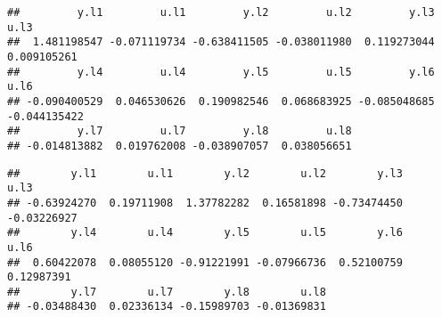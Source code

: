 \documentclass[
]{book}
\newenvironment{Shaded}{\begin{snugshade}}{\end{snugshade}}
\newcommand{\AttributeTok}[1]{\textcolor[rgb]{0.77,0.63,0.00}{#1}}
\newcommand{\DecValTok}[1]{\textcolor[rgb]{0.00,0.00,0.81}{#1}}
\newcommand{\FunctionTok}[1]{\textcolor[rgb]{0.00,0.00,0.00}{#1}}
\newcommand{\NormalTok}[1]{#1}
\newcommand{\OtherTok}[1]{\textcolor[rgb]{0.56,0.35,0.01}{#1}}
\newcommand{\SpecialCharTok}[1]{\textcolor[rgb]{0.00,0.00,0.00}{#1}}
\newcommand{\StringTok}[1]{\textcolor[rgb]{0.31,0.60,0.02}{#1}}
\begin{document}
\begin{Shaded}
\end{Shaded}

\begin{verbatim}
##         y.l1         u.l1         y.l2         u.l2         y.l3         u.l3 
##  1.481198547 -0.071119734 -0.638411505 -0.038011980  0.119273044  0.009105261 
##         y.l4         u.l4         y.l5         u.l5         y.l6         u.l6 
## -0.090400529  0.046530626  0.190982546  0.068683925 -0.085048685 -0.044135422 
##         y.l7         u.l7         y.l8         u.l8 
## -0.014813882  0.019762008 -0.038907057  0.038056651
\end{verbatim}

\begin{Shaded}
\end{Shaded}

\begin{verbatim}
##        y.l1        u.l1        y.l2        u.l2        y.l3        u.l3 
## -0.63924270  0.19711908  1.37782282  0.16581898 -0.73474450 -0.03226927 
##        y.l4        u.l4        y.l5        u.l5        y.l6        u.l6 
##  0.60422078  0.08055120 -0.91221991 -0.07966736  0.52100759  0.12987391 
##        y.l7        u.l7        y.l8        u.l8 
## -0.03488430  0.02336134 -0.15989703 -0.01369831
\end{verbatim}
\end{document}
